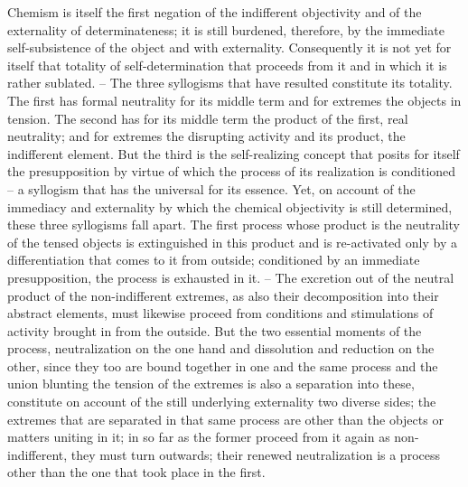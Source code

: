 Chemism is itself the first negation of the indifferent objectivity and
of the externality of determinateness; it is still burdened, therefore, by the
immediate self-subsistence of the object and with externality. Consequently
it is not yet for itself that totality of self-determination that proceeds from it
and in which it is rather sublated. – The three syllogisms that have resulted
constitute its totality. The first has formal neutrality for its middle term and
for extremes the objects in tension. The second has for its middle term the
product of the first, real neutrality; and for extremes the disrupting activity
and its product, the indifferent element. But the third is the self-realizing
concept that posits for itself the presupposition by virtue of which the
process of its realization is conditioned – a syllogism that has the universal
for its essence. Yet, on account of the immediacy and externality by which
the chemical objectivity is still determined, these three syllogisms fall apart.
The first process whose product is the neutrality of the tensed objects is
extinguished in this product and is re-activated only by a differentiation
that comes to it from outside; conditioned by an immediate presupposition,
the process is exhausted in it. – The excretion out of the neutral product
of the non-indifferent extremes, as also their decomposition into their
abstract elements, must likewise proceed from conditions and stimulations
of activity brought in from the outside. But the two essential moments of
the process, neutralization on the one hand and dissolution and reduction
on the other, since they too are bound together in one and the same process
and the union blunting the tension of the extremes is also a separation into
these, constitute on account of the still underlying externality two diverse
sides; the extremes that are separated in that same process are other than the
objects or matters uniting in it; in so far as the former proceed from it again
as non-indifferent, they must turn outwards; their renewed neutralization
is a process other than the one that took place in the first.

